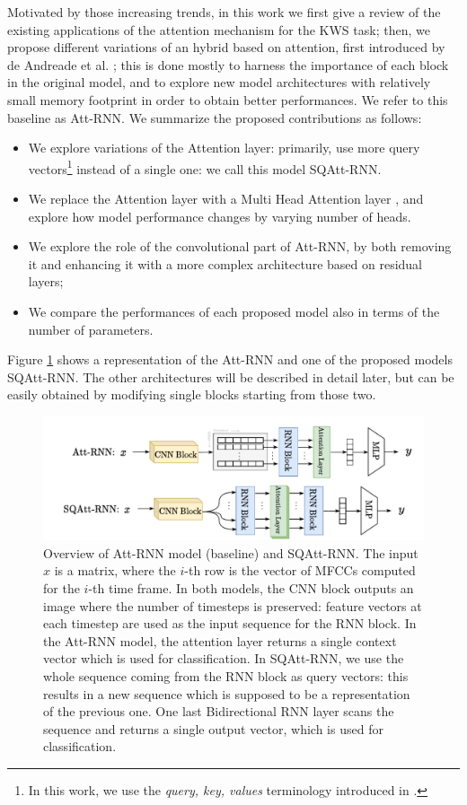Motivated by those increasing trends, in this work we first give a review of the existing applications of the attention mechanism for the KWS task; then, we propose different variations of an hybrid based on attention, first introduced by de Andreade et al. \cite{attention2018andreade}; this is done mostly to harness the importance of each block in the original model, and to explore new model architectures with relatively small memory footprint in order to obtain better performances. We refer to this baseline as Att-RNN. We summarize the proposed contributions as follows:
\begin{itemize}
	\item We explore variations of the Attention layer: primarily, use more query vectors\footnote{In this work, we use the \textit{query, key, values} terminology introduced in \cite{attentionisall2017vaswani}.} instead of a single one: we call this model SQAtt-RNN. 
	\item We replace the Attention layer with a Multi Head Attention layer \cite{attentionisall2017vaswani}, and explore how model performance changes by varying number of heads.
	\item We explore the role of the convolutional part of Att-RNN, by both removing it and enhancing it with a more complex architecture based on residual layers;
	\item We compare the performances of each proposed model also in terms of the number of parameters.
	
\end{itemize}
Figure \ref{fig:models_overview} shows a representation of the Att-RNN and one of the proposed models SQAtt-RNN. The other architectures will be described in detail later, but can be easily obtained by modifying single blocks starting from those two.

\begin{figure}
	\centering
	\includegraphics[width=0.9\linewidth]{imgs/models_overview.pdf}
	\caption{Overview of Att-RNN model (baseline) and SQAtt-RNN. The input $x$ is a matrix, where the $i$-th row is the vector of MFCCs computed for the $i$-th time frame. In both models, the CNN block outputs an image where the number of timesteps is preserved: feature vectors at each timestep are used as the input sequence for the RNN block. In the Att-RNN model, the attention layer returns a single context vector which is used for classification. In SQAtt-RNN, we use the whole sequence coming from the RNN block as query vectors: this results in a new sequence which is supposed to be a representation of the previous one. One last Bidirectional RNN layer scans the sequence and returns a single output vector, which is used for classification.}
	\label{fig:models_overview}
\end{figure}


